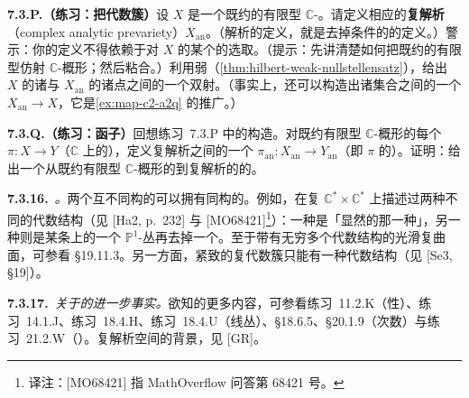 \textbf{7.3.P.（练习：把\trComplex{}代数簇\trAnalytification{}）}\quad 设 $X$ 是一个既约的有限型 $\mathbb{C}$-\trScheme。请定义相应的\textbf{复解析\trPrevariety{}}（complex analytic prevariety）$X_{\mathrm{an}}$。（解析\trPrevariety{}的定义，就是去掉\trHausdorff{}条件的\trVariety{}的定义。）警示：你的定义不得依赖于对 $X$ 的某个\trAffine\trCover{}的选取。（提示：先讲清楚如何把既约的有限型仿射 $\mathbb{C}$-概形\trAnalytification{}；然后粘合。）利用弱\trNullstellensatz（\cref{thm:hilbert-weak-nullstellensatz}），给出 $X$ 的诸\trClosedPoint{}与 $X_{\mathrm{an}}$ 的诸点之间的一个双射。（事实上，还可以构造出诸集合之间的一个\trContinuousMap{} $X_{\mathrm{an}}\to X$，它是\cref{ex:map-c2-a2q} 的推广。）%

\textbf{7.3.Q.（练习：\trAnalytification{}函子）}\quad 回想练习~7.3.P 中的\trAnalytification{}构造。对既约有限型 $\mathbb{C}$-概形的每个\trMorphism{} $\pi\colon X\to Y$（$\mathbb{C}$ 上的），定义复解析\trPrevariety{}之间的一个\trMorphism{} $\pi_{\mathrm{an}}\colon X_{\mathrm{an}}\to Y_{\mathrm{an}}$（即 $\pi$ 的\trAnalytification{}）。证明：\trAnalytification{}给出一个从既约有限型 $\mathbb{C}$-概形的\trCategory{}到复解析\trPrevariety{}的\trCategory{}的\trFunctor。

\textbf{7.3.16.}\ \emph{\trhRemark{}。}\quad 两个互不同构的\trVariety{}可以拥有同构的\trAnalytification{}。例如，\trSerre{}在复\trManifold{} $\mathbb{C}^*\times\mathbb{C}^*$ 上描述过两种不同的代数结构（见 [Ha2, p.~232] 与 [MO68421]\footnote{译注：[MO68421] 指 MathOverflow 问答第 68421 号。}）：一种是「显然的那一种」，另一种则是某条\trEllipticCurve{}上的一个 $\mathbb{P}^1$-丛再去掉一个\trSection。至于带有无穷多个代数结构的光滑复曲面，可参看 \S19.11.3。另一方面，紧致的复代数簇只能有一种代数结构（见 [Se3, \S19]）。

\textbf{7.3.17.}\ \emph{关于\trAnalytification{}的进一步事实。}\quad 欲知\trAnalytification{}的更多内容，可参看练习~11.2.K（\trHausdorff{}性）、\mbox{练习~14.1.J}、\mbox{练习~18.4.H}、\mbox{练习~18.4.U}（线丛）、\S18.6.5、\S20.1.9（次数）与\mbox{练习~21.2.W}（\trManifold）。复解析空间的背景，见 [GR]。

